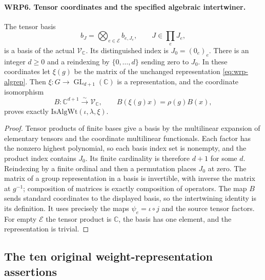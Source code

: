 \paragraph{WRP6. Tensor coordinates and the specified algebraic intertwiner.}
\label{claim:WRP6}
The tensor basis
\[
                 b_J=\bigotimes_{e\in\mathcal E}b_{e,J_e},
                   \qquad J\in\prod_e J_e,
\]
is a basis of the actual $\mathcal V_{\mathbb C}$.  Its
distinguished index is $J_0=(0_e)_e$.  There is an integer
$d\geq0$ and a reindexing by $\{0,\ldots,d\}$ sending
zero to $J_0$.  In these coordinates let $\xi(g)$ be the
matrix of the unchanged representation \eqref{eq:wrp-algrep}.
Then $\xi:G\to\operatorname{GL}_{d+1}(\mathbb C)$ is a
representation, and the coordinate isomorphism
\begin{equation}\label{eq:wrp-intertwiner}
 B:\mathbb C^{d+1}\xrightarrow{\sim}\mathcal V_{\mathbb C},
              \qquad B(\xi(g)x)=\rho(g)B(x),
\end{equation}
proves exactly $\mathrm{IsAlgWt}(\iota,\lambda,\xi)$.
\begin{proof}
Tensor products of finite bases give a basis by the
multilinear expansion of elementary tensors and the
coordinate multilinear functionals.  Each factor has the
nonzero highest polynomial, so each basis index set is
nonempty, and the product index contains $J_0$.  Its finite
cardinality is therefore $d+1$ for some $d$.  Reindexing by
a finite ordinal and then a permutation places $J_0$ at
zero.  The matrix of a group representation in a basis is
invertible, with inverse the matrix at $g^{-1}$; composition
of matrices is exactly composition of operators.
The map $B$ sends standard coordinates to the displayed
basis, so the intertwining identity is its definition.
It uses precisely the maps $\psi_e=\iota\circ j$ and the
source tensor factors.  For empty $\mathcal E$ the tensor
product is $\mathbb C$, the basis has one element, and the
representation is trivial.
\end{proof}

\subsection{The ten original weight-representation assertions}

